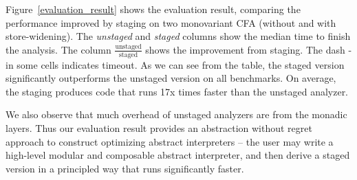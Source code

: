 Figure~\ref{evaluation_result} shows the evaluation result, comparing
the performance improved by staging on two monovariant CFA (without
and with store-widening). The \textit{unstaged} and \textit{staged}
columns show the median time to finish the analysis. The column
$\frac{\text{unstaged}}{\text{staged}}$ shows the improvement from
staging. The dash - in some cells indicates timeout.  As we can see
from the table, the staged version significantly outperforms the
unstaged version on all benchmarks.  On average, the staging produces
code that runs 17x times faster than the unstaged analyzer.

We also observe that much overhead of unstaged analyzers are from the
monadic layers. Thus our evaluation result provides an abstraction
without regret approach to construct optimizing abstract interpreters
-- the user may write a high-level modular and composable abstract
interpreter, and then derive a staged version in a principled way that
runs significantly faster.

